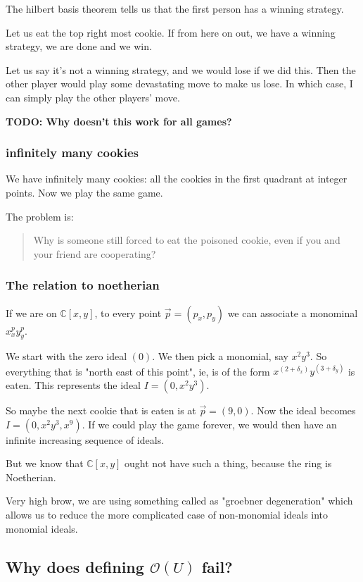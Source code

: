 \documentclass{book}
\newcommand{\C}{\ensuremath{\mathbb{C}}}
\renewcommand{\O}{\ensuremath{\mathcal{O}}}
\theoremstyle{definition}
\begin{document}
The hilbert basis theorem tells us that the first person has a winning
strategy.  

Let us eat the top right most cookie. If from here on out, we have a winning
strategy, we are done and we win.

Let us say it's not a winning strategy, and we would lose if we did this.
Then the other player would play some devastating move to make us lose.
In which case, I can simply play the other players' move.

\textbf{TODO: Why doesn't this work for all games?}

\subsubsection{infinitely many cookies}
We have infinitely many cookies: all the cookies in the first quadrant at
integer points. Now we play the same game. 

The problem is:

\begin{quote}
Why is someone still forced to eat the poisoned cookie, even if you and
your friend are cooperating?
\end{quote}


\subsubsection{The relation to noetherian}

If we are on $\C[x, y]$, to every point $\vec p = (p_x, p_y)$ we can associate
a monominal $x^p_x y^p_y$.

We start with the zero ideal $(0)$. We then pick a monomial, say $x^2 y^3$.
So everything that is "north east of this point", ie, is of the form
$x^{(2 +\delta_x)} y^{(3+\delta_y)}$ is eaten. This represents the ideal
$I = (0, x^2 y^3)$.

So maybe the next cookie that is eaten is at $\vec p = (9, 0)$. Now the ideal
becomes $I = (0, x^2 y^3, x^9)$. If we could play the game forever, we would
then have an infinite increasing sequence of ideals.

But we know that $\C[x, y]$ ought not have such a thing, because the ring
is Noetherian. 


Very high brow, we are using something called as "groebner degeneration" which
allows us to reduce the more complicated case of non-monomial ideals into
monomial ideals.

\subsection{Why does defining $\O(U)$ fail?}
\end{document}

